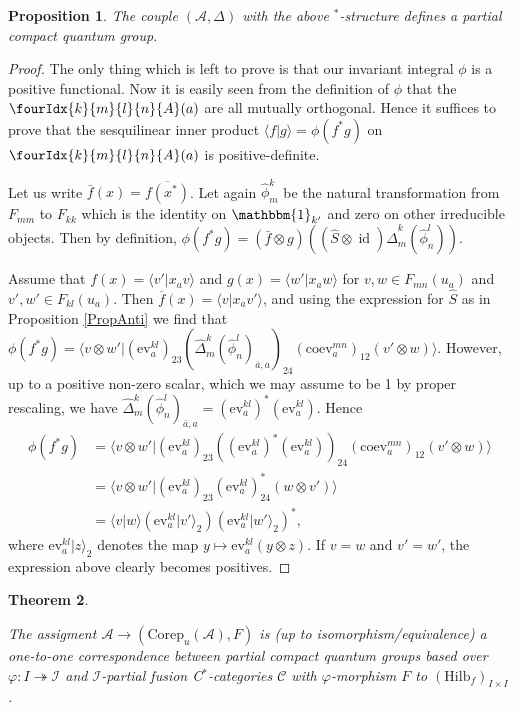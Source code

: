 \documentclass[10pt]{article}
\DeclareMathOperator{\id}{id}
\newcommand{\Corep}{\mathrm{Corep}}
\newcommand{\CatCC}{\mathscr{C}}
\newcommand{\Hilb}{\mathrm{Hilb}}
\newcommand{\ev}{\mathrm{ev}}
\newcommand{\coev}{\mathrm{coev}}
\newcommand{\Unitb}{\mathbbm{1}}
\newcommand{\Gr}[5]{\fourIdx{#2}{#4}{#3}{#5}{#1}}%
\newtheorem{Theorem}{Theorem}[section]
\newtheorem{Prop}[Theorem]{Proposition}
\theoremstyle{definition}
\numberwithin{equation}{section}
\begin{document}
\begin{Prop} The couple $(\mathscr{A},\Delta)$ with the above $^*$-structure defines a partial compact quantum group.
\end{Prop}
\begin{proof} The only thing which is left to prove is that our
  invariant integral $\phi$ is a positive functional. Now it is easily
  seen from the definition of $\phi$ that the $\Gr{A}{k}{l}{m}{n}(a)$
  are all mutually orthogonal. Hence it suffices to prove that the
  sesquilinear inner product $\langle f| g\rangle = \phi(f^*g)$ on
  $\Gr{A}{k}{l}{m}{n}(a)$ is positive-definite.

  Let us write $\bar{f}(x) = \overline{f(x^*)}$. Let again
  $\hat{\phi}^k_m$ be the natural transformation from $F_{mm}$ to
  $F_{kk}$ which is the identity on $\Unitb_{k'}$ and zero on other
  irreducible objects. Then by definition, $\phi(f^*g) =
  (\bar{f}\otimes g)((\hat{S}\otimes
  \id)\hat{\Delta}^k_m(\hat{\phi}^l_n)).$

Assume  that $f(x) = \langle v'| x_a v\rangle$ and
  $g(x) = \langle w' | x_aw\rangle$ for $v,w\in F_{mn}(u_a)$ and
  $v',w'\in F_{kl}(u_a)$. Then
  $\overline{f}(x) = \langle v|x_{a} v'\rangle$, and
 using the expression for $\hat{S}$ as
  in Proposition \ref{PropAnti} we find that
  $
    \phi(f^*g) = \langle v \otimes w'|
    (\ev_{a}^{kl})_{23} 
    (\hat\Delta^{k}_{m}(\hat \phi^{l}_{n})_{\bar a, a})_{24} 
    (\coev^{mn}_{a})_{12} (v'\otimes
    w)\rangle.$
  However, up to a positive non-zero scalar, which we may assume to be
  1 by proper rescaling, we
  have $\hat{\Delta}^k_m(\hat{\phi}^l_n)_{\bar{a}, a} =
  (\ev^{kl}_{a})^{*}(\ev^{kl}_{a}).$ Hence
  \begin{align*}
    \phi(f^*g) &=
\langle v \otimes w'|     (\ev^{kl}_{a})_{23}  (
  (\ev^{kl}_{a})^{*}(\ev^{kl}_{a}))_{24}
 (\coev^{mn}_{a})_{12} (v'\otimes w)\rangle \\
&= \langle v \otimes w'|        (\ev^{kl}_{a})_{23} 
  (\ev^{kl}_{a})^{*}_{24}
 (w\otimes v')\rangle \\
    &= \langle v|w\rangle (\ev^{kl}_{a}|v'\rangle_{2})
    (\ev_{a}^{kl}|w'\rangle_{2})^{*},
  \end{align*}
where $\ev_{a}^{kl}|z\rangle_{2}$ denotes the map $y \mapsto
\ev_{a}^{kl}(y\otimes z)$.
If $v=w$ and $v'=w'$, the expression above clearly becomes positives.
\end{proof} 

\begin{Theorem} \label{TheoTKPCQG}

The assigment $\mathscr{A}\rightarrow (\Corep_u(\mathscr{A}),F)$ is (up to isomorphism/equivalence) a one-to-one correspondence between partial compact quantum groups based over $\varphi:I\twoheadrightarrow \mathscr{I}$ and $\mathscr{I}$-partial fusion C$^*$-categories $\CatCC$ with $\varphi$-morphism $F$ to $(\Hilb_f)_{I\times I}$.
\end{Theorem} 
\end{document}
